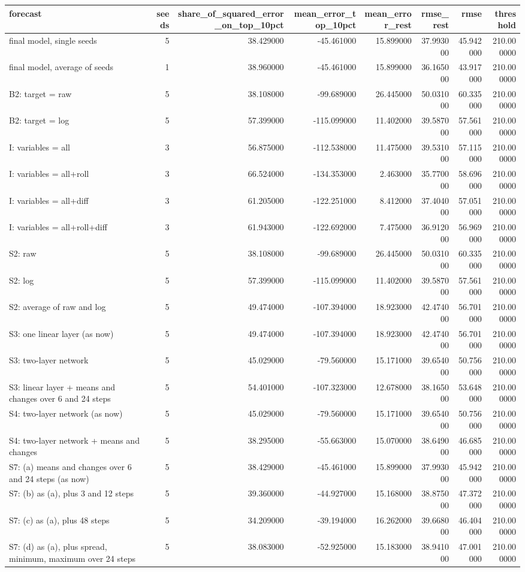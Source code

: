 \begin{tabular}{lrrrrrrr}
\toprule
forecast & seeds & share_of_squared_error_on_top_10pct & mean_error_top_10pct & mean_error_rest & rmse_rest & rmse & threshold \\
\midrule
final model, single seeds & 5 & 38.429000 & -45.461000 & 15.899000 & 37.993000 & 45.942000 & 210.000000 \\
final model, average of seeds & 1 & 38.960000 & -45.461000 & 15.899000 & 36.165000 & 43.917000 & 210.000000 \\
B2: target = raw & 5 & 38.108000 & -99.689000 & 26.445000 & 50.031000 & 60.335000 & 210.000000 \\
B2: target = log & 5 & 57.399000 & -115.099000 & 11.402000 & 39.587000 & 57.561000 & 210.000000 \\
I: variables = all & 3 & 56.875000 & -112.538000 & 11.475000 & 39.531000 & 57.115000 & 210.000000 \\
I: variables = all+roll & 3 & 66.524000 & -134.353000 & 2.463000 & 35.770000 & 58.696000 & 210.000000 \\
I: variables = all+diff & 3 & 61.205000 & -122.251000 & 8.412000 & 37.404000 & 57.051000 & 210.000000 \\
I: variables = all+roll+diff & 3 & 61.943000 & -122.692000 & 7.475000 & 36.912000 & 56.969000 & 210.000000 \\
S2: raw & 5 & 38.108000 & -99.689000 & 26.445000 & 50.031000 & 60.335000 & 210.000000 \\
S2: log & 5 & 57.399000 & -115.099000 & 11.402000 & 39.587000 & 57.561000 & 210.000000 \\
S2: average of raw and log & 5 & 49.474000 & -107.394000 & 18.923000 & 42.474000 & 56.701000 & 210.000000 \\
S3: one linear layer (as now) & 5 & 49.474000 & -107.394000 & 18.923000 & 42.474000 & 56.701000 & 210.000000 \\
S3: two-layer network & 5 & 45.029000 & -79.560000 & 15.171000 & 39.654000 & 50.756000 & 210.000000 \\
S3: linear layer + means and changes over 6 and 24 steps & 5 & 54.401000 & -107.323000 & 12.678000 & 38.165000 & 53.648000 & 210.000000 \\
S4: two-layer network (as now) & 5 & 45.029000 & -79.560000 & 15.171000 & 39.654000 & 50.756000 & 210.000000 \\
S4: two-layer network + means and changes & 5 & 38.295000 & -55.663000 & 15.070000 & 38.649000 & 46.685000 & 210.000000 \\
S7: (a) means and changes over 6 and 24 steps (as now) & 5 & 38.429000 & -45.461000 & 15.899000 & 37.993000 & 45.942000 & 210.000000 \\
S7: (b) as (a), plus 3 and 12 steps & 5 & 39.360000 & -44.927000 & 15.168000 & 38.875000 & 47.372000 & 210.000000 \\
S7: (c) as (a), plus 48 steps & 5 & 34.209000 & -39.194000 & 16.262000 & 39.668000 & 46.404000 & 210.000000 \\
S7: (d) as (a), plus spread, minimum, maximum over 24 steps & 5 & 38.083000 & -52.925000 & 15.183000 & 38.941000 & 47.001000 & 210.000000 \\
\bottomrule
\end{tabular}
